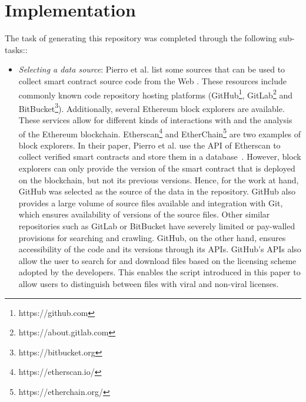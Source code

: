 \documentclass[10pt,conference]{IEEEtran}
\begin{document}
	
	\section{Implementation}
	\label{sec:implementation}
	
	The task of generating this repository was completed through the following sub-tasks::
	\begin{itemize}
		\item \textit{Selecting a data source}: Pierro et al. list some sources that can be used to collect smart contract source code from the Web \cite{pierro}. These resources include commonly known code repository hosting platforms (GitHub\footnote{https://github.com}, GitLab\footnote{https://about.gitlab.com} and BitBucket\footnote{https://bitbucket.org}). Additionally, several Ethereum block explorers are available. These services allow for different kinds of interactions with and the analysis of the Ethereum blockchain. Etherscan\footnote{https://etherscan.io/} and EtherChain\footnote{https://etherchain.org/} are two examples of block explorers. In their paper, Pierro et al. use the API of Etherscan to collect verified smart contracts and store them in a database~\cite{pierro}. However, block explorers can only provide the version of the smart contract that is deployed on the blockchain, but not its previous versions. Hence, for the work at hand, GitHub was selected as the source of the data in the repository. GitHub also provides a large volume of source files available and integration with Git, which ensures availability of versions of the source files. Other similar repositories such as GitLab or BitBucket have severely limited or pay-walled provisions for searching and crawling. GitHub, on the other hand, ensures accessibility of the code and its versions through its APIs. GitHub's APIs also allow the user to search for and download files based on the licensing scheme adopted by the developers. This enables the script introduced in this paper to allow users to distinguish between files with viral and non-viral licenses. 

\end{itemize}
\end{document}
